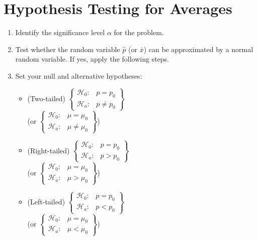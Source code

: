 \documentclass{ximera}
\begin{document}
\section*{Hypothesis Testing for Averages}
\begin{enumerate}
    \item Identify the significance level $\alpha$ for the problem.
    \item Test whether the random variable $\hat p$ (or $\bar x$) can be approximated by a normal random variable. If yes, apply the following steps.       
    \item Set your null and alternative hypotheses:
        \begin{itemize}        
            \item (Two-tailed) $\left\{\begin{array}{ll} \mathcal H_0:& p=p_0 \\ \mathcal H_a: & p\neq p_0\end{array}\right\}$\\
            (or $\left\{\begin{array}{ll} \mathcal H_0:& \mu=\mu_0 \\ \mathcal H_a: & \mu\neq \mu_0\end{array}\right\}$)
            \item (Right-tailed) $\left\{\begin{array}{ll} \mathcal H_0:& p=p_0 \\ \mathcal H_a: & p>p_0\end{array}\right\}$\\
            (or $\left\{\begin{array}{ll} \mathcal H_0:& \mu=\mu_0 \\ \mathcal H_a: & \mu> \mu_0\end{array}\right\}$)
            \item (Left-tailed) $\left\{\begin{array}{ll} \mathcal H_0:& p=p_0 \\ \mathcal H_a: & p< p_0\end{array}\right\}$\\
            (or $\left\{\begin{array}{ll} \mathcal H_0:& \mu=\mu_0 \\ \mathcal H_a: & \mu< \mu_0\end{array}\right\}$)
            

\end{itemize}
\end{enumerate}
\end{document}
